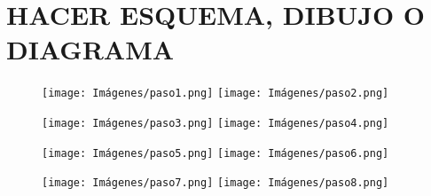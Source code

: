 \section*{\centering\large{HACER ESQUEMA, DIBUJO O DIAGRAMA}}

\begin{figure}[!ht]
	\centering
	\texttt{[image: Imágenes/paso1.png]}
	\texttt{[image: Imágenes/paso2.png]}
\end{figure}
\begin{figure}[!ht]
	\centering
	\texttt{[image: Imágenes/paso3.png]}
	\texttt{[image: Imágenes/paso4.png]}
\end{figure}
\begin{figure}[!ht]
	\centering
	\texttt{[image: Imágenes/paso5.png]}
	\texttt{[image: Imágenes/paso6.png]}
\end{figure}
\begin{figure}[!ht]
	\centering
	\texttt{[image: Imágenes/paso7.png]}
	\texttt{[image: Imágenes/paso8.png]}
\end{figure}



